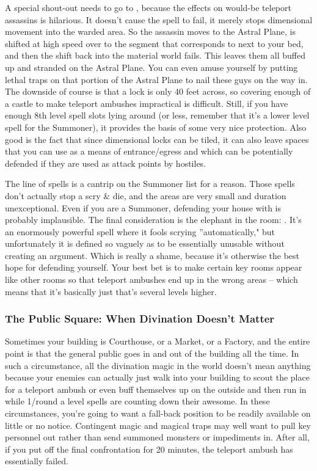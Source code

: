 A special shout-out needs to go to , because the effects on would-be teleport assassins is hilarious. It doesn't cause the spell to fail, it merely stops dimensional movement into the warded area. So the assassin moves to the Astral Plane, is shifted at high speed over to the segment that corresponds to next to your bed, and then the shift back into the material world fails. This leaves them all buffed up and stranded on the Astral Plane. You can even amuse yourself by putting lethal traps on that portion of the Astral Plane to nail these guys on the way in. The downside of course is that a lock is only 40 feet across, so covering enough of a castle to make teleport ambushes impractical is difficult. Still, if you have enough 8th level spell slots lying around (or less, remember that it's a lower level spell for the Summoner), it provides the basis of some very nice protection. Also good is the fact that since dimensional locks can be tiled, it can also leave spaces that you can use as a means of entrance/egress and which can be potentially defended if they are used as attack points by hostiles.

The  line of spells is a cantrip on the Summoner list for a reason. Those spells don't actually stop a scry \& die, and the areas are very small and duration unexceptional. Even if you are a Summoner, defending your house with  is probably implausible. The final consideration is the elephant in the room: . It's an enormously powerful spell where it fools scrying ''automatically," but unfortunately it is defined so vaguely as to be essentially unusable without creating an argument. Which is really a shame, because it's otherwise the best hope for defending yourself. Your best bet is to make certain key rooms appear like other rooms so that teleport ambushes end up in the wrong areas -- which means that it's basically just  that's several levels higher.

\subsubsection{The Public Square: When Divination Doesn't Matter}

Sometimes your building is Courthouse, or a Market, or a Factory, and the entire point is that the general public goes in and out of the building all the time. In such a circumstance, all the divination magic in the world doesn't mean anything because your enemies can actually just walk into your building to scout the place for a teleport ambush or even buff themselves up on the outside and then run in while 1/round a level spells are counting down their awesome. In these circumstances, you're going to want a fall-back position to be readily available on little or no notice. Contingent magic and magical traps may well want to pull key personnel out rather than send summoned monsters or impediments in. After all, if you put off the final confrontation for 20 minutes, the teleport ambush has essentially failed.


